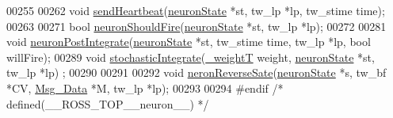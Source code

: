 \begin{DoxyCode}
00255 
00262 \textcolor{keywordtype}{void} \hyperlink{neuron_8h_a766dff9e530486b055e97ebe392268b8}{sendHeartbeat}(\hyperlink{structneuron_state}{neuronState} *st, tw\_lp *lp, tw\_stime time);
00263 
00271 \textcolor{keywordtype}{bool} \hyperlink{neuron_8h_a3520b013e0c2f711b9f5c16e19306be6}{neuronShouldFire}(\hyperlink{structneuron_state}{neuronState} *st, tw\_lp *lp);
00272 
00281 \textcolor{keywordtype}{void} \hyperlink{neuron_8h_aabaff47eadb1e61b34c19b6e982f6511}{neuronPostIntegrate}(\hyperlink{structneuron_state}{neuronState} *st, tw\_stime time, tw\_lp *lp, \textcolor{keywordtype}{bool} 
      willFire);
00289 \textcolor{keywordtype}{void} \hyperlink{neuron_8h_afee2e0acc66d8d10aee8d52c8d245c82}{stochasticIntegrate}(\hyperlink{assist_8h_aa73c5ea0fe4ba938c96e6771b38dcb2a}{\_weightT} weight, \hyperlink{structneuron_state}{neuronState} *st, tw\_lp *lp)
      ;
00290 
00291 
00292 \textcolor{keywordtype}{void} \hyperlink{neuron_8h_aaae24f12a4b2a537740f29d65eb3e51e}{neronReverseSate}(\hyperlink{structneuron_state}{neuronState} *s, tw\_bf *CV, 
      \hyperlink{struct_msg___data}{Msg\_Data} *M, tw\_lp *lp);
00293 
00294 \textcolor{preprocessor}{#endif }\textcolor{comment}{/* defined(\_\_ROSS\_TOP\_\_neuron\_\_) */}\textcolor{preprocessor}{}
\end{DoxyCode}
